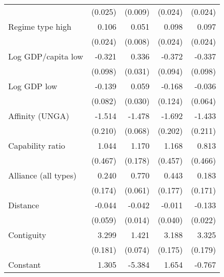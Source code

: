 \begin{table}[htbp]
\begin{tabular}{l*{4}{D{.}{.}{-1}}}
   &     (0.025)         &     (0.009)         &     (0.024)         &     (0.024)         \\
\addlinespace
Regime type high&       0.106\sym{***}&      0.051\sym{***}&      0.098\sym{***}&      0.097\sym{***}\\
   &     (0.024)         &     (0.008)         &     (0.024)         &     (0.024)         \\
\addlinespace
Log GDP/capita low&      -0.321\sym{**} &       0.336\sym{***}&      -0.372\sym{***}&      -0.337\sym{***}\\
   &     (0.098)         &     (0.031)         &     (0.094)         &     (0.098)         \\
\addlinespace
Log GDP low&      -0.139\sym{+}  &      0.059\sym{*}  &      -0.168         &     -0.036         \\
   &     (0.082)         &     (0.030)         &     (0.124)         &     (0.064)         \\
\addlinespace
Affinity (UNGA) &      -1.514\sym{***}&      -1.478\sym{***}&      -1.692\sym{***}&      -1.433\sym{***}\\
   &     (0.210)         &     (0.068)         &     (0.202)         &     (0.211)         \\
\addlinespace
Capability ratio&       1.044\sym{*}  &       1.170\sym{***}&       1.168\sym{*}  &       0.813\sym{+}  \\
   &     (0.467)         &     (0.178)         &     (0.457)         &     (0.466)         \\
\addlinespace
Alliance (all types) &       0.240         &       0.770\sym{***}&       0.443\sym{*}  &       0.183         \\
   &     (0.174)         &     (0.061)         &     (0.177)         &     (0.171)         \\
\addlinespace
Distance&     -0.044         &     -0.042\sym{**} &     -0.011         &      -0.133\sym{***}\\
   &     (0.059)         &     (0.014)         &     (0.040)         &     (0.022)         \\
\addlinespace
Contiguity&       3.299\sym{***}&       1.421\sym{***}&       3.188\sym{***}&       3.325\sym{***}\\
   &     (0.181)         &     (0.074)         &     (0.175)         &     (0.179)         \\
\addlinespace
Constant&       1.305         &      -5.384\sym{***}&       1.654         &      -0.767         \\

\end{tabular}
\end{table}

